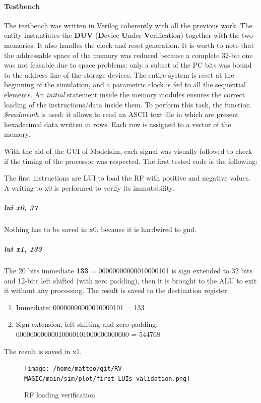 \documentclass[a4paper]{article}
\begin{document}
\paragraph{Testbench} The testbench was written in Verilog coherently with all the previous work. The entity instantiates the \textbf{DUV} (\textbf{D}evice \textbf{U}nder \textbf{V}erification) together with the two memories. It also handles the clock and reset generation.
It is worth to note that the addressable space of the memory was reduced because a complete 32-bit one was not feasable due to space problems: only a subset of the PC bits was bound to the address line of the storage devices.
The entire system is reset at the beginning of the simulation, and a parametric clock is fed to all the sequential elements. 
An \textit{initial} statement inside the memory modules ensures the correct loading of the instructions/data inside them. To perform this task, the function \textit{\$readmemh} is used: it allows to read an ASCII text file in which are present hexadecimal data written in rows. Each row is assigned to a vector of the memory. 

With the aid of the GUI of Modelsim, each signal was visually followed to check if the timing of the processor was respected. The first tested code is the following:


The first instructions are LUI to load the RF with positive and negative values. A writing to x0 is performed to verify its immutability.

\subparagraph*{lui x0, 37} Nothing has to be saved in x0, because it is hardwired to gnd.

\subparagraph*{lui x1, 133} The 20 bits immediate \textbf{133} = 00000000000010000101 is sign extended to 32 bits and 12-bits left shifted (with zero padding), then it is brought to the ALU to exit it without any processing. The result is saved to the destination register. 
\begin{enumerate}
\item Immediate: 00000000000010000101 = 133
\item Sign extension, left shifting and zero padding: 00000000000010000101000000000000 = 544768
\end{enumerate} 
The result is saved in x1. 

\begin{figure}[hbtp]
    \centering
    \texttt{[image: /home/matteo/git/RV-MAGIC/main/sim/plot/first\_LUIs\_validation.png]}
    \caption{RF loading verification}
    \label{fig:first_LUIs_ver}
\end{figure}
\end{document}
